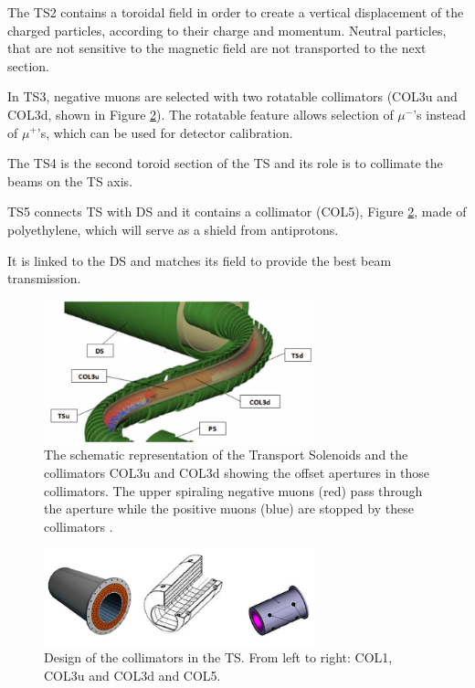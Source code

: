 The TS2 contains a toroidal field in order to create a 
vertical displacement of the charged particles,
according to their charge and momentum.
Neutral particles, that are not sensitive to the magnetic 
field are not transported to the next section.

In TS3, negative muons are selected with two rotatable collimators (COL3u and COL3d, 
shown in Figure \ref{fig:collimatorsshape}). 
The rotatable feature allows selection of $\mu^-$'s instead of $\mu^+$'s, which can 
be used for detector calibration. 

The TS4 is the second toroid section of the TS and its role is 
to collimate the beams on the TS axis.

TS5 connects TS with DS and it contains a collimator (COL5), 
Figure \ref{fig:collimatorsshape}, made of polyethylene, 
which will serve as a shield from antiprotons.

It is linked to the DS 
and matches its field to provide the best beam transmission.


\begin{figure}[!h]
    \centering
    \includegraphics[width =0.7\textwidth]{figures/png/800px-MuonBeamlineCollimators2.png}
    \caption[The Transport Solenoids and the collimators.]{The schematic representation of the Transport Solenoids and the collimators COL3u and 
    COL3d showing the offset apertures in those collimators. The 
    upper spiraling negative muons (red) pass through the aperture while 
    the positive muons (blue) are stopped by these collimators \cite{tsview}.}
    \label{fig:collimators}
    \end{figure}
    \begin{figure}[!h]
        \centering
        \includegraphics[width =0.7\textwidth]{figures/png/Screenshot_20240706_120535.png}
        \caption[The design of the collimators in the TS.]{Design of the collimators in the TS. From left to right: COL1, COL3u and COL3d
        and COL5.}
        \label{fig:collimatorsshape}
        \end{figure}

